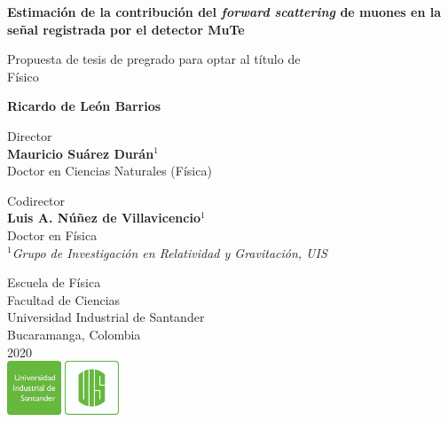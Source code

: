 \documentclass[12pt]{report}
\begin{document}
\begin{titlepage}
   \begin{center}
       \vspace*{1cm}
       
       
       \large
       \textbf{Estimación de la contribución del \textit{forward scattering} de muones en la señal registrada por el detector MuTe}
       
 
       \vspace{1.5cm}
 
       \small
       Propuesta de tesis de pregrado para optar al título de \\
       Físico
       
       
       \normalsize
       \textbf{Ricardo de León Barrios}
       
       \small
       \vspace{1cm}
       Director\\
       \textbf{Mauricio Suárez Durán}$^1$\\
       Doctor en Ciencias Naturales (Física)
       
       \vspace{1cm}
       Codirector\\
       \textbf{Luis A. Núñez de Villavicencio}$^1$\\
       Doctor en Física\\
       
       \vspace{1cm}
       $^1$\textit{Grupo de Investigación en Relatividad y Gravitación, UIS}
 
       \vfill
       
       
 
 
       
 
       \small
       Escuela de Física\\
       Facultad de Ciencias\\
       Universidad Industrial de Santander\\
       Bucaramanga, Colombia\\
       2020\\
       \vspace{0.3cm}
       \includegraphics[width=0.25\textwidth]{logo/logoUIS.png}
 
   \end{center}
\end{titlepage}
\end{document}
